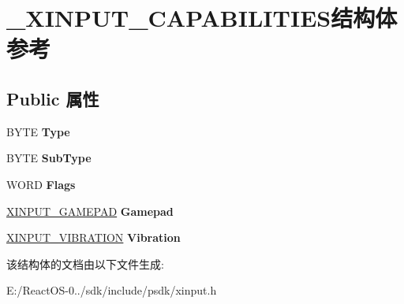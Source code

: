 \hypertarget{struct___x_i_n_p_u_t___c_a_p_a_b_i_l_i_t_i_e_s}{}\section{\+\_\+\+X\+I\+N\+P\+U\+T\+\_\+\+C\+A\+P\+A\+B\+I\+L\+I\+T\+I\+E\+S结构体 参考}
\label{struct___x_i_n_p_u_t___c_a_p_a_b_i_l_i_t_i_e_s}
\subsection*{Public 属性}
\begin{DoxyCompactItemize}
\item 
\mbox{\label{struct___x_i_n_p_u_t___c_a_p_a_b_i_l_i_t_i_e_s_aebd4bc7d89a584060bae91095e701710}} 
B\+Y\+TE {\bfseries Type}
\item 
\mbox{\label{struct___x_i_n_p_u_t___c_a_p_a_b_i_l_i_t_i_e_s_ab686f41df1cb509eebda27f84c76faa1}} 
B\+Y\+TE {\bfseries Sub\+Type}
\item 
\mbox{\label{struct___x_i_n_p_u_t___c_a_p_a_b_i_l_i_t_i_e_s_af3e5697dec6976b9fe19832528461b54}} 
W\+O\+RD {\bfseries Flags}
\item 
\mbox{\label{struct___x_i_n_p_u_t___c_a_p_a_b_i_l_i_t_i_e_s_a616f63856159601b68de30f107c810f5}} 
\hyperlink{struct___x_i_n_p_u_t___g_a_m_e_p_a_d}{X\+I\+N\+P\+U\+T\+\_\+\+G\+A\+M\+E\+P\+AD} {\bfseries Gamepad}
\item 
\mbox{\label{struct___x_i_n_p_u_t___c_a_p_a_b_i_l_i_t_i_e_s_a0202876df8a4467d284266e725b8256d}} 
\hyperlink{struct___x_i_n_p_u_t___v_i_b_r_a_t_i_o_n}{X\+I\+N\+P\+U\+T\+\_\+\+V\+I\+B\+R\+A\+T\+I\+ON} {\bfseries Vibration}
\end{DoxyCompactItemize}


该结构体的文档由以下文件生成\+:\begin{DoxyCompactItemize}
\item 
E\+:/\+React\+O\+S-\/0../sdk/include/psdk/xinput.\+h\end{DoxyCompactItemize}
